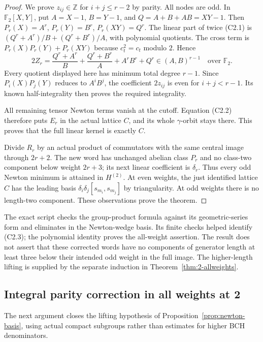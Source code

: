 \documentclass[11pt,a4paper]{article}
\theoremstyle{definition}
\begin{document}
\begin{proof}
We prove $z_{ij}\in\mathbb Z$ for $i+j\leq r-2$ by parity.
All nodes are odd. In $\mathbb F_2[X,Y]$, put
$A=X-1$, $B=Y-1$, and $Q=A+B+AB=XY-1$.
Then $P_r(X)=A^r$, $P_r(Y)=B^r$, $P_r(XY)=Q^r$.
The linear part of twice (C2.1) is
$(Q^r+A^r)/B+(Q^r+B^r)/A$, with polynomial quotients.
The cross term is $P_r(X)P_r(Y)+P_r(XY)$ because
$c_t^2=c_t$ modulo $2$. Hence
\[
 2Z_r=\frac{Q^r+A^r}{B}+\frac{Q^r+B^r}{A}
                      +A^rB^r+Q^r
       \in(A,B)^{r-1}\quad\text{over }\mathbb F_2.    \tag{C2.3}
\]
Every quotient displayed here has minimum total degree
$r-1$. Since $P_i(X)P_j(Y)$ reduces to $A^iB^j$, the
coefficient $2z_{ij}$ is even for $i+j<r-1$. Its known
half-integrality then proves the required integrality.

All remaining tensor Newton terms vanish at the cutoff.
Equation (C2.2) therefore puts $E_r$ in the actual lattice
$C$, and its whole $\gamma$-orbit stays there. This proves
that the full linear kernel is exactly $C$.

Divide $R_r$ by an actual product of commutators with the
same central image through $2r+2$. The new word has unchanged
abelian class $P_r$ and no class-two component below weight
$2r+3$; its next linear coefficient is $\delta_r$. Thus every
odd Newton minimum is attained in $H^{(2)}$. At even weights,
the just identified lattice $C$ has the leading basis
$\delta_i\delta_j[s_{m_i},s_{m_j}]$ by triangularity. At odd
weights there is no length-two component. These observations
prove the theorem.
\end{proof}

The exact script 
checks the group-product formula against its geometric-series
form and eliminates in the Newton-wedge basis. Its finite
checks helped identify (C2.3); the polynomial identity proves
the all-weight assertion. The result does not assert that
these corrected words have no components of generator length
at least three below their intended odd weight in the full
image. The higher-length lifting is supplied by the separate induction
in Theorem~\ref{thm:2-allweights}.

\subsection{Integral parity correction in all weights at 2}

The next argument closes the lifting hypothesis of
Proposition~\ref{prop:newton-basis}, using actual compact
subgroups rather than estimates for higher BCH denominators.
\end{document}
